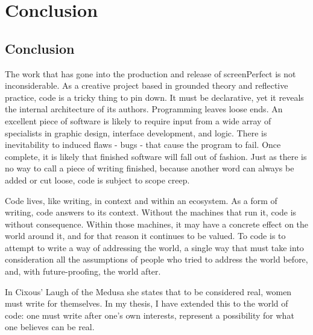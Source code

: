 
\chapter{Conclusion}\thispagestyle{empty} %

\label{Chapter5} %


\section{Conclusion}The work that has gone into the production and release of screenPerfect is not inconsiderable. As a creative project based in grounded theory and reflective practice, code is a tricky thing to pin down. It must be declarative, yet it reveals the internal architecture of its authors. Programming leaves loose ends. An excellent piece of software is likely to require input from a wide array of specialists in graphic design, interface development, and logic. There is inevitability to induced flaws - bugs - that cause the program to fail. Once complete, it is likely that finished software will fall out of fashion. Just as there is no way to call a piece of writing finished, because another word can always be added or cut loose, code is subject to scope creep. 

Code lives, like writing, in context and within an ecosystem. As a form of writing, code answers to its context. Without the machines that run it, code is without consequence. Within those machines, it may have a concrete effect on the world around it, and for that reason it continues to be valued. To code is to attempt to write a way of addressing the world, a single way that must take into consideration all the assumptions of people who tried to address the world before, and, with future-proofing, the world after. 

In Cixous' Laugh of the Medusa \parencite{cixous} she states that to be considered real, women must write for themselves. In my thesis, I have extended this to the world of code: one must write after one's own interests, represent a possibility for what one believes can be real.

